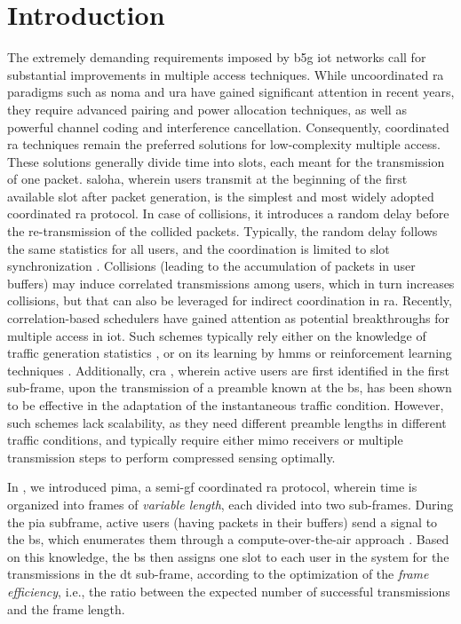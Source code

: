 \documentclass[conference]{IEEEtran}
\begin{document}
\section{Introduction}\label{sec:introduction}
The extremely demanding requirements imposed by \ac{b5g} \ac{iot} networks call for substantial improvements in multiple access techniques.   
While uncoordinated \ac{ra} paradigms such as \ac{noma} \cite{Saito13Non, Dai18A, Chen18Toward} and \ac{ura} \cite{Polyanskiy17A, decurninge2020tensor, rech2023unsourced} have gained significant attention in recent years, they require advanced pairing and power allocation techniques, as well as powerful channel coding and interference cancellation. Consequently, coordinated \ac{ra} techniques remain the preferred solutions for low-complexity multiple access. These solutions generally divide time into slots, each meant for the transmission of one packet.
\Ac{saloha}, wherein users transmit at the beginning of the first available slot after packet generation, is the simplest and most widely adopted coordinated \ac{ra} protocol. In case of collisions, it introduces a random delay before the re-transmission of the collided packets. Typically, the random delay follows the same statistics for all users, and the coordination is limited to slot synchronization \cite{Rivest87Network}. 
Collisions (leading to the accumulation of packets in user buffers) may induce correlated transmissions among users, which in turn increases collisions, but that can also be leveraged for indirect coordination in \ac{ra}. Recently, correlation-based schedulers have gained attention as potential breakthroughs for multiple access in \ac{iot}. Such schemes typically rely either on the knowledge of traffic generation statistics \cite{Kalor18Random}, or on its learning by \acp{hmm} \cite{Moretto21a} or reinforcement learning techniques \cite{Rech21Coordinated, Destounis19Learn}.
Additionally, \ac{cra} \cite{Wunder14Compressive, Choi20On}, wherein active users are first identified in the first sub-frame, upon the transmission of a preamble known at the \ac{bs}, has been shown to be effective in the adaptation of the instantaneous traffic condition.
However, such schemes lack scalability, as they need different preamble lengths in different traffic conditions, and typically require either \ac{mimo} receivers or multiple transmission steps to perform compressed sensing optimally.

In \cite{rech2023partial}, we introduced \ac{pima}, a semi-\ac{gf} coordinated \ac{ra} protocol, wherein time is organized into frames of {\em variable length}, each divided into two sub-frames. During the \ac{pia} subframe, active users (having packets in their buffers) send a signal to the \ac{bs}, which enumerates them through a compute-over-the-air approach  \cite{Goldenbaum13Robust}. Based on this knowledge, the \ac{bs} then assigns one slot to each user in the system for the transmissions in the \ac{dt} sub-frame, according to the optimization of the {\em frame efficiency}, i.e., the ratio between the expected number of successful transmissions and the frame length. 
\end{document}
